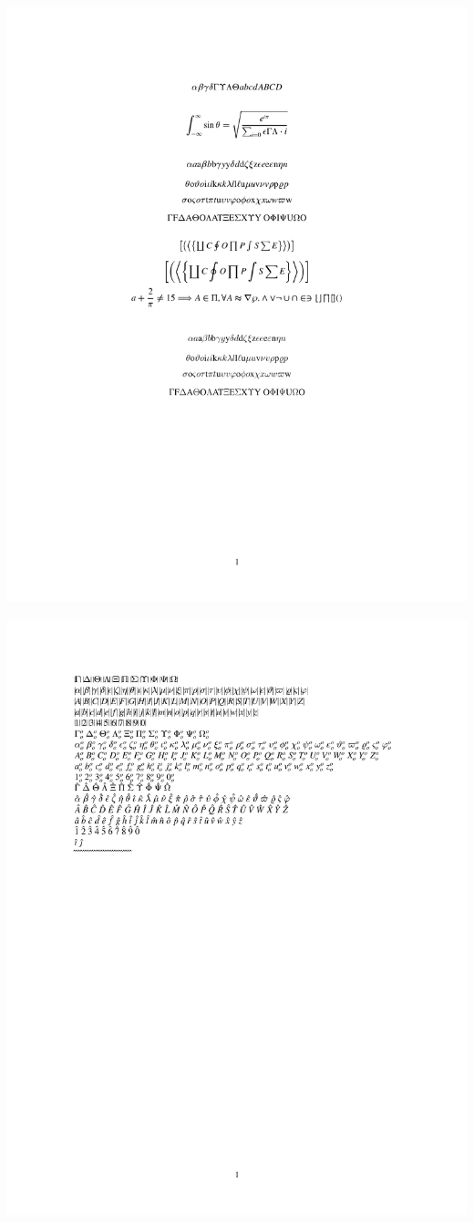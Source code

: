 \documentclass[twocolumn]{article}
\begin{document}
 \noindent\includegraphics*{../results/times-font}\par
{} \noindent\includegraphics*{../results/times-pos}\par
\end{document}
